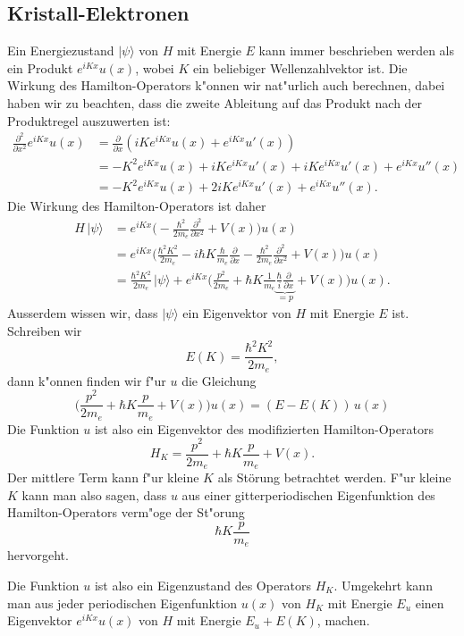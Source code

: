 \subsection{Kristall-Elektronen}
Ein Energiezustand $|\psi\rangle$ von $H$ mit Energie $E$
kann immer beschrieben werden als ein Produkt $e^{iKx} u(x)$,
wobei $K$ ein beliebiger Wellenzahlvektor ist.
Die Wirkung des Hamilton-Operators k"onnen wir nat"urlich auch
berechnen, dabei haben wir zu beachten, dass die zweite Ableitung
auf das Produkt nach der Produktregel auszuwerten ist:
\begin{align*}
\frac{\partial^2}{\partial x^2}e^{iKx}u(x)
&=
\frac{\partial}{\partial x}
\left(
iKe^{iKx}u(x) + e^{iKx}u'(x)
\right)
\\
&=
-K^2e^{iKx}u(x) + iKe^{iKx}u'(x)+iKe^{iKx}u'(x)+e^{iKx}u''(x)
\\
&=
-K^2e^{iKx}u(x) + 2iKe^{iKx}u'(x)+e^{iKx}u''(x).
\end{align*}
Die Wirkung des Hamilton-Operators ist daher
\begin{align*}
H\,|\psi\rangle
&=
e^{iKx}\biggl(
-\frac{\hbar^2}{2m_e}\frac{\partial^2}{\partial x^2} + V(x)
\biggr)u(x)
\\
&=e^{iKx}\biggl(
\frac{\hbar^2K^2}{2m_e}
-i\hbar K\frac{\hbar}{m_e}\frac{\partial}{\partial x}
-\frac{\hbar^2}{2m_e}\frac{\partial^2}{\partial x^2}
+V(x)
\biggr)u(x)
\\
&=\frac{\hbar^2K^2}{2m_e}\,|\psi\rangle
+e^{iKx}\biggl(\frac{p^2}{2m_e}
+\hbar K\frac{1}{m_e}\underbrace{\frac{\hbar}{i}\frac{\partial}{\partial x}}_{=p}
+V(x)\biggr)u(x).
\end{align*}
Ausserdem wissen wir, dass $|\psi\rangle$ ein Eigenvektor von $H$ mit 
Energie $E$ ist.
Schreiben wir
\[
E(K)=\frac{\hbar^2K^2}{2m_e},
\]
dann k"onnen finden wir f"ur $u$ die Gleichung
\begin{equation}
\biggl(\frac{p^2}{2m_e}+\hbar K\frac{p}{m_e}+V(x)\biggr) u(x) = (E-E(K))\,u(x)
\label{skript:uewgleichung}
\end{equation}
Die Funktion $u$ ist also ein Eigenvektor des modifizierten Hamilton-Operators
\[
H_K= \frac{p^2}{2m_e}+\hbar K\frac{p}{m_e}+V(x).
\]
Der mittlere Term kann f"ur kleine $K$ als Störung betrachtet werden.
F"ur kleine $K$ kann man also sagen, dass $u$ aus einer gitterperiodischen
Eigenfunktion des Hamilton-Operators verm"oge der St"orung
\[
\hbar K\frac{p}{m_e}
\]
hervorgeht.

Die Funktion $u$ ist also ein Eigenzustand des Operators $H_K$. Umgekehrt
kann man aus jeder periodischen Eigenfunktion $u(x)$ von $H_K$ mit Energie
$E_u$ einen Eigenvektor $e^{iKx}u(x)$ von $H$ mit Energie $E_u+E(K)$, machen.

